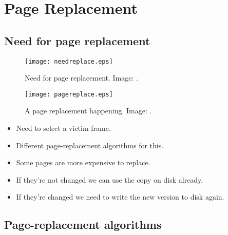 \documentclass{beamer}
\begin{document}
\section{Page Replacement}

\subsection{Need for page replacement}

\begin{frame}{\insertsubsectionhead}
  \begin{figure}
    \texttt{[image: needreplace.eps]}
    \caption{Need for page replacement.
      Image: \cite{Silberschatz2013osc}.}
  \end{figure}
\end{frame}

\begin{frame}{\insertsubsectionhead}
  \begin{figure}
    \texttt{[image: pagereplace.eps]}
    \caption{A page replacement happening.
      Image: \cite{Silberschatz2013osc}.}
  \end{figure}
\end{frame}

\begin{frame}{\insertsubsectionhead}
  \begin{itemize}
    \item Need to select a victim frame.
    \item Different page-replacement algorithms for this.
    \item Some pages are more expensive to replace.
    \item If they're not changed we can use the copy on disk already.
    \item If they're changed we need to write the new version to disk again.
  \end{itemize}
\end{frame}

\subsection{Page-replacement algorithms}
\end{document}
